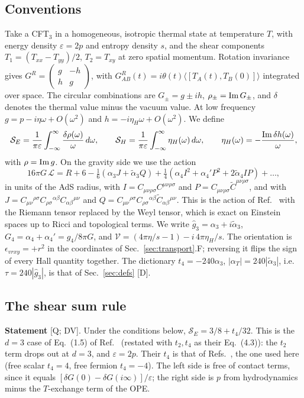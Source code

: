 \subsection{Conventions}
Take a CFT$_3$ in a homogeneous, isotropic thermal state at temperature $T$, with energy density $\varepsilon=2p$ and entropy
density $s$, and the shear components $T_1=(T_{xx}-T_{yy})/2$, $T_2=T_{xy}$ at zero spatial momentum. Rotation invariance
gives $G^R=\begin{pmatrix}g&-h\\h&g\end{pmatrix}$, with $G^R_{AB}(t)=i\theta(t)\langle[T_A(t),T_B(0)]\rangle$ integrated over
space. The circular combinations are $G_\pm=g\pm ih$, $\rho_\pm={\rm Im}\,G_\pm$, and $\delta$ denotes the thermal value minus
the vacuum value. At low frequency $g=p-i\eta\omega+O(\omega^2)$ and $h=-i\eta_H\omega+O(\omega^2)$. We define
\begin{equation}
\mathcal S_E=\frac1{\pi\varepsilon}\int_{-\infty}^{\infty}\frac{\delta\rho(\omega)}{\omega}\,d\omega,\qquad
\mathcal S_H=\frac1{\pi\varepsilon}\int_{-\infty}^{\infty}\eta_H(\omega)\,d\omega,\qquad
\eta_H(\omega)=-\frac{{\rm Im}\,\delta h(\omega)}{\omega},
\label{eq:tr-SESH}
\end{equation}
with $\rho={\rm Im}\,g$. On the gravity side we use the action
\begin{equation}
16\pi G\,\mathcal L=R+6-\tfrac16(\alpha_3J+\tilde\alpha_3Q)+\tfrac14(\alpha_4I^2+\alpha_4'P^2+2\tilde\alpha_4IP)+\dots,
\label{eq:tr-action}
\end{equation}
in units of the AdS radius, with $I=C_{\mu\nu\rho\sigma}C^{\mu\nu\rho\sigma}$ and $P=C_{\mu\nu\rho\sigma}\tilde C^{\mu\nu\rho\sigma}$,
and with $J=C_{\mu\nu}{}^{\rho\sigma}C_{\rho\sigma}{}^{\alpha\beta}C_{\alpha\beta}{}^{\mu\nu}$ and
$Q=C_{\mu\nu}{}^{\rho\sigma}C_{\rho\sigma}{}^{\alpha\beta}\tilde C_{\alpha\beta}{}^{\mu\nu}$. This is the action of
Ref.~\cite{CHLPS} with the Riemann tensor replaced by the Weyl tensor, which is exact on Einstein spaces up to Ricci and
topological terms. We write $\hat g_3=\alpha_3+i\tilde\alpha_3$, $G_4=\alpha_4+\alpha_4'=g_4/8\pi G$, and
$\mathcal V=(4\pi\eta/s-1)-i\,4\pi\eta_H/s$. The orientation is $\epsilon_{vrxy}=+r^2$ in the coordinates of
Sec.~\ref{sec:transport}.F; reversing it flips the sign of every Hall quantity together. The dictionary $t_4=-240\alpha_3$,
$|\alpha_T|=240|\tilde\alpha_3|$, i.e.\ $\tau=240|\hat g_3|$, is that of Sec.~\ref{sec:defs} [D].

\subsection{The shear sum rule}
\textbf{Statement} [Q; DV]. Under the conditions below, $\mathcal S_E=3/8+t_4/32$. This is the $d=3$ case of Eq.~(1.5) of
Ref.~\cite{Chowdhury:2016hjy} (restated with $t_2,t_4$ as their Eq.~(4.3)): the $t_2$ term drops out at $d=3$, and $\varepsilon=2p$.
Their $t_4$ is that of Refs.~\cite{Buchel,HofmanMaldacena}, the one used here (free scalar $t_4=4$, free fermion $t_4=-4$). The
left side is free of contact terms, since it equals $[\delta G(0)-\delta G(i\infty)]/\varepsilon$; the right side is $p$ from
hydrodynamics minus the $T$-exchange term of the OPE.

